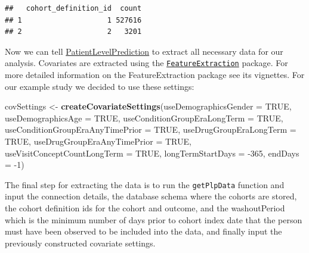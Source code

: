 \documentclass[11pt]{book}
\newenvironment{Shaded}{\begin{snugshade}}{\end{snugshade}}
\newcommand{\DataTypeTok}[1]{\textcolor[rgb]{0.13,0.29,0.53}{#1}}
\newcommand{\DecValTok}[1]{\textcolor[rgb]{0.00,0.00,0.81}{#1}}
\newcommand{\KeywordTok}[1]{\textcolor[rgb]{0.13,0.29,0.53}{\textbf{#1}}}
\newcommand{\NormalTok}[1]{#1}
\newcommand{\OtherTok}[1]{\textcolor[rgb]{0.56,0.35,0.01}{#1}}
\newcommand{\StringTok}[1]{\textcolor[rgb]{0.31,0.60,0.02}{#1}}
\theoremstyle{definition}
\theoremstyle{definition}
\theoremstyle{definition}
\theoremstyle{remark}
\begin{document}
\begin{verbatim}
##   cohort_definition_id  count
## 1                    1 527616
## 2                    2   3201
\end{verbatim}

Now we can tell \href{https://ohdsi.github.io/PatientLevelPrediction/}{PatientLevelPrediction} to extract all necessary data for our analysis. Covariates are extracted using the \href{https://ohdsi.github.io/FeatureExtraction/}{\texttt{FeatureExtraction}} package. For more detailed information on the FeatureExtraction package see its vignettes. For our example study we decided to use these settings:

\begin{Shaded}
\begin{Highlighting}[]
\NormalTok{covSettings <-}\StringTok{ }\KeywordTok{createCovariateSettings}\NormalTok{(}\DataTypeTok{useDemographicsGender =} \OtherTok{TRUE}\NormalTok{,}
                                       \DataTypeTok{useDemographicsAge =} \OtherTok{TRUE}\NormalTok{,}
                                       \DataTypeTok{useConditionGroupEraLongTerm =} \OtherTok{TRUE}\NormalTok{,}
                                       \DataTypeTok{useConditionGroupEraAnyTimePrior =} \OtherTok{TRUE}\NormalTok{,}
                                       \DataTypeTok{useDrugGroupEraLongTerm =} \OtherTok{TRUE}\NormalTok{,}
                                       \DataTypeTok{useDrugGroupEraAnyTimePrior =} \OtherTok{TRUE}\NormalTok{,}
                                       \DataTypeTok{useVisitConceptCountLongTerm =} \OtherTok{TRUE}\NormalTok{,}
                                       \DataTypeTok{longTermStartDays =} \DecValTok{-365}\NormalTok{,}
                                       \DataTypeTok{endDays =} \DecValTok{-1}\NormalTok{)}
\end{Highlighting}
\end{Shaded}

The final step for extracting the data is to run the \texttt{getPlpData} function and input the connection details, the database schema where the cohorts are stored, the cohort definition ids for the cohort and outcome, and the washoutPeriod which is the minimum number of days prior to cohort index date that the person must have been observed to be included into the data, and finally input the previously constructed covariate settings.
\end{document}
